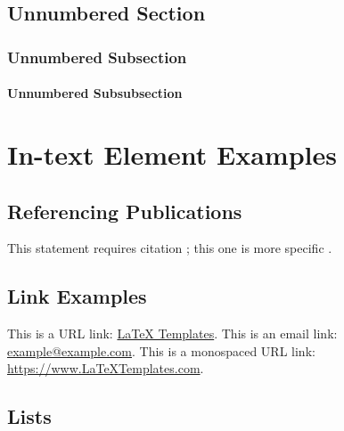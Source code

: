 \documentclass[
	11pt, %
	fleqn, %
	letterpaper, %
]{CommodoreBlueBook}
\begin{document}

\section*{Unnumbered Section}

\subsection*{Unnumbered Subsection}

\subsubsection*{Unnumbered Subsubsection}


\chapter{In-text Element Examples}

\section{Referencing Publications}

This statement requires citation \cite{Smith:2022jd}; this one is more specific \cite[162]{Smith:2021qr}.


\section{Link Examples}

This is a URL link: \href{https://www.latextemplates.com}{LaTeX Templates}. This is an email link: \href{mailto:example@example.com}{example@example.com}. This is a monospaced URL link: \url{https://www.LaTeXTemplates.com}.


\section{Lists}
\end{document}
